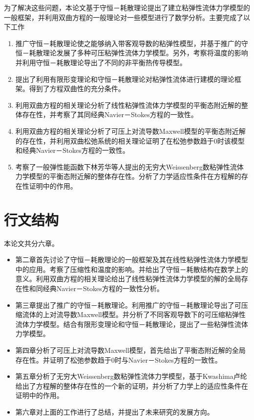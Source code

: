 \documentclass{article}
\begin{document}
为了解决这些问题，本论文基于守恒－耗散理论提出了建立粘弹性流体力学模型的一般框架，并利用双曲方程的一般理论对一些模型进行了数学分析。主要完成了以下工作
\begin{enumerate}
\item 推广守恒－耗散理论使之能够纳入带客观导数的粘弹性模型，并基于推广的守恒－耗散理论发展了多种可压粘弹性流体力学模型。另外，考察将温度的影响并利用守恒－耗散理论导出了不同的非平衡热传导模型。
\item 提出了利用有限形变理论和守恒－耗散理论对粘弹性流体进行建模的理论框架。得到了方程双曲性的充分条件。
\item 利用双曲方程的相关理论分析了线性粘弹性流体力学模型的平衡态附近解的整体存在性，并考察了其同经典Navier－Stokes方程的一致性。
\item 利用双曲方程的相关理论分析了可压上对流导数Maxwell模型的平衡态附近解的存在性，并利用双曲松弛系统的相关理论证明了在松弛参数趋于0时该模型和经典Navier－Stokes方程的一致性。
\item 考察了一般弹性能函数下林芳华等人提出的无穷大Weissenberg数粘弹性流体力学模型的平衡态附近解的整体存在性。分析了力学适应性条件在方程解的存在性证明中的作用。
\end{enumerate}

\section{行文结构}
本论文共分六章。
\begin{itemize}
\item 第二章首先讨论了守恒－耗散理论的一般框架及其在线性粘弹性流体力学模型中的应用。考察了压缩性和温度的影响。并给出了守恒－耗散结构在数学上的意义。利用双曲方程的相关理论给出了线性粘弹性流体力学模型的解的全局存在性和同经典Navier－Stokes方程的一致性分析。
\item 第三章提出了推广的守恒－耗散理论。利用推广的守恒－耗散理论导出了可压缩流体的上对流导数Maxwell模型。并分析了不同客观导数下的可压缩粘弹性流体力学模型。结合有限形变理论和守恒－耗散理论，提出了一些粘弹性流体力学模型。
\item 第四章分析了可压上对流导数Maxwell模型，首先给出了平衡态附近解的全局存在性。并证明了松弛参数趋于0时与Navier－Stokes方程的一致性。
\item 第五章分析了无穷大Weissenberg数粘弹性流体力学模型，基于Kwashima卢纶给出了方程解的整体存在性的一个新的证明，并分析了力学上的适应性条件在证明中的作用。
\item 第六章对上面的工作进行了总结，并提出了未来研究的发展方向。
\end{itemize}
 
\end{document}
